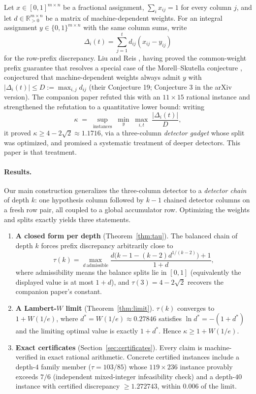 \documentclass[11pt]{article}
\theoremstyle{definition}
\newcommand{\R}{\mathbb{R}}
\newcommand{\disc}{\Delta}
\newcommand{\W}{W}
\begin{document}
Let $x\in[0,1]^{m\times n}$ be a fractional assignment,
$\sum_ix_{ij}=1$ for every column $j$, and let $d\in\R_{>0}^{m\times n}$ be
a matrix of machine-dependent weights.  For an integral assignment
$y\in\{0,1\}^{m\times n}$ with the same column sums, write
\[
 \disc_i(t)=\sum_{j=1}^{t}d_{ij}(x_{ij}-y_{ij})
\]
for the row-prefix discrepancy.  Liu and Reis \citep{LiuReis2026}, having
proved the common-weight prefix guarantee that resolves a special case of
the Morell--Skutella conjecture \citep{MorellSkutella2022}, conjectured
that machine-dependent weights always admit $y$ with
$|\disc_i(t)|\le D:=\max_{i,j}d_{ij}$ (their Conjecture 19; Conjecture 3 in
the arXiv version).  The companion paper \citep{Muffatti2026} refuted this
with an $11\times15$ rational instance and strengthened the refutation to a
quantitative lower bound: writing
\[
 \kappa\;=\;\sup_{\text{instances}}\;
 \min_{y}\;\max_{i,t}\;\frac{|\disc_i(t)|}{D},
\]
it proved $\kappa\ge4-2\sqrt2\approx1.1716$, via a three-column
\emph{detector gadget} whose split was optimized, and promised a
systematic treatment of deeper detectors.  This paper is that treatment.

\paragraph{Results.}
Our main construction generalizes the three-column detector to a
\emph{detector chain} of depth $k$: one hypothesis column followed by
$k-1$ chained detector columns on a fresh row pair, all coupled to a
global accumulator row.  Optimizing the weights and splits exactly yields
three statements.

\begin{enumerate}
\item \textbf{A closed form per depth} (Theorem~\ref{thm:tau}).  The
balanced chain of depth $k$ forces prefix discrepancy arbitrarily close to
\[
 \tau(k)=\max_{d\ \text{admissible}}
 \frac{d\bigl(k-1-(k-2)d^{1/(k-2)}\bigr)+1}{1+d},
\]
where admissibility means the balance splits lie in $[0,1]$
(equivalently the displayed value is at most $1+d$), and
$\tau(3)=4-2\sqrt2$ recovers the companion paper's constant.
\item \textbf{A Lambert-$W$ limit} (Theorem~\ref{thm:limit}).
$\tau(k)$ converges to $1+\W(1/e)$, where $d^*=\W(1/e)\approx0.27846$
satisfies $\ln d^*=-(1+d^*)$ and the limiting optimal value is exactly
$1+d^*$.  Hence $\kappa\ge1+\W(1/e)$.
\item \textbf{Exact certificates} (Section~\ref{sec:certificates}).
Every claim is machine-verified in exact rational arithmetic.  Concrete
certified instances include a depth-$4$ family member
($\tau=103/85$) whose $119\times236$ instance provably exceeds $7/6$
(independent mixed-integer infeasibility check) and a depth-$40$ instance
with certified discrepancy $\ge1.272743$, within $0.006$ of the limit.
\end{enumerate}
\end{document}
